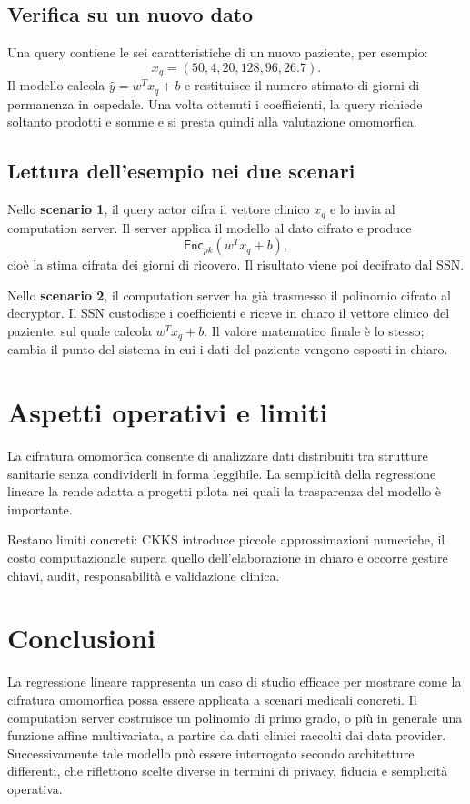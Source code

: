 \subsection{Verifica su un nuovo dato}
Una query contiene le sei caratteristiche di un nuovo paziente, per esempio:
\begin{equation}
x_q=(50,4,20,128,96,26.7).
\end{equation}
Il modello calcola $\hat{y}=w^Tx_q+b$ e restituisce il numero stimato di giorni di permanenza in ospedale. Una volta ottenuti i coefficienti, la query richiede soltanto prodotti e somme e si presta quindi alla valutazione omomorfica.

\subsection{Lettura dell'esempio nei due scenari}
Nello \textbf{scenario 1}, il query actor cifra il vettore clinico $x_q$ e lo invia al computation server. Il server applica il modello al dato cifrato e produce
\begin{equation}
\mathsf{Enc}_{pk}(w^Tx_q+b),
\end{equation}
cio\`e la stima cifrata dei giorni di ricovero. Il risultato viene poi decifrato dal SSN.

Nello \textbf{scenario 2}, il computation server ha gi\`a trasmesso il polinomio cifrato al decryptor. Il SSN custodisce i coefficienti e riceve in chiaro il vettore clinico del paziente, sul quale calcola $w^Tx_q+b$. Il valore matematico finale \`e lo stesso; cambia il punto del sistema in cui i dati del paziente vengono esposti in chiaro.

\section{Aspetti operativi e limiti}
La cifratura omomorfica consente di analizzare dati distribuiti tra strutture sanitarie senza condividerli in forma leggibile. La semplicit\`a della regressione lineare la rende adatta a progetti pilota nei quali la trasparenza del modello \`e importante.

Restano limiti concreti: CKKS introduce piccole approssimazioni numeriche, il costo computazionale supera quello dell'elaborazione in chiaro e occorre gestire chiavi, audit, responsabilit\`a e validazione clinica.

\section{Conclusioni}
La regressione lineare rappresenta un caso di studio efficace per mostrare come la cifratura omomorfica possa essere applicata a scenari medicali concreti. Il computation server costruisce un polinomio di primo grado, o pi\`u in generale una funzione affine multivariata, a partire da dati clinici raccolti dai data provider. Successivamente tale modello pu\`o essere interrogato secondo architetture differenti, che riflettono scelte diverse in termini di privacy, fiducia e semplicit\`a operativa.

